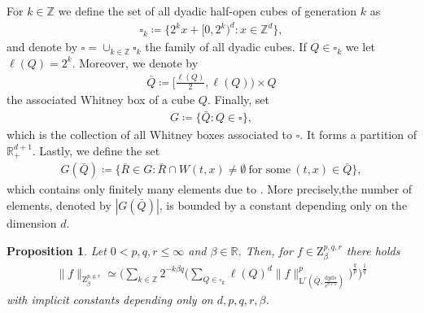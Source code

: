 \documentclass[11pt, leqno,parskip=half]{amsart}
\newtheorem{proposition}[theorem]{Proposition}
\theoremstyle{definition}
\newcommand{\IR}{\mathbb{R}}
\newcommand{\IZ}{\mathbb{Z}}
\renewcommand{\L}{\mathrm{L}}
\newcommand{\Z}{\mathrm{Z}}
\renewcommand{\d}{\mathrm{d}}
\numberwithin{equation}{section}
\begin{document}
For $k\in \IZ$ we define the set of all dyadic half-open cubes of generation $k$ as
\begin{align*}
    \square_k \coloneqq \{ 2^kx + [0,2^k)^d : x\in \IZ^d\},
\end{align*}
and denote by $\square = \cup_{k\in\IZ} \square_k$ the family of all dyadic cubes. If $Q\in\square_k$ we let $\ell(Q) = 2^k$. Moreover, we denote by
\begin{align*}
    \bar Q \coloneqq \Big[\frac{\ell(Q)}{2} , \ell(Q) \Big) \times Q
\end{align*}
the associated Whitney box of a cube $Q$. Finally, set
\begin{align*}
    G \coloneqq \{ \bar Q : Q\in \square \},
\end{align*}
which is the collection of all Whitney boxes associated to $\square$. It forms a partition of $\IR^{d+1}_+$. Lastly, we define the set
\begin{align*}
    G(\bar Q) \coloneqq \{ \bar R \in G : \bar R \cap W(t,x) \neq \emptyset \ \text{for some} \ (t,x)\in \bar Q \},
\end{align*}
which contains only finitely many elements due to \cite[Lemma 2.19]{AA}. More precisely,the number of elements, denoted by $|G(\bar Q)|$, is bounded by a constant depending only on the dimension $d$.

\begin{proposition}
\label{prop: dyadic char}
    Let $0<p,q,r\leq \infty$ and $\beta\in \IR$. Then, for $f \in \Z^{p,q,r}_\beta$ there holds
    \begin{align*}
        \|f\|_{\Z^{p,q,r}_\beta} \simeq \Big( \sum\limits_{k\in\IZ} 2^{-k\beta q} \Big(\sum\limits_{Q\in \square_k} \ell(Q)^d \|f\|_{\L^r(\bar Q , \frac{\d y \d s}{s^{d+1}})}^p \Big)^\frac{q}{p} \Big)^\frac{1}{q}
    \end{align*}
    with implicit constants depending only on $d,p,q,r,\beta$.
\end{proposition}
\end{document}
